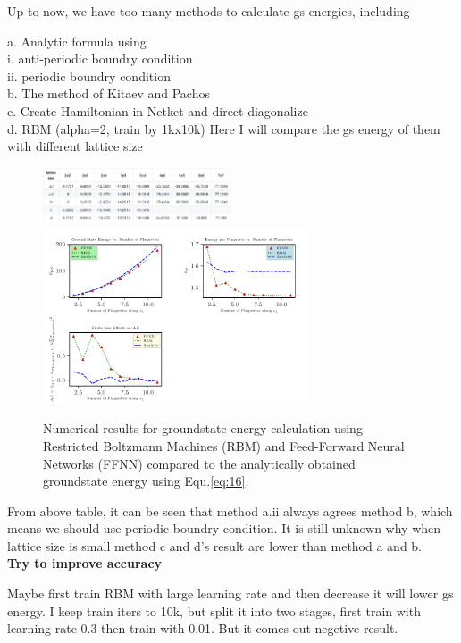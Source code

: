 \documentclass{article}
\begin{document}
Up to now, we have too many methods to calculate gs energies, including

    a. Analytic formula using \\
        i. anti-periodic boundry condition \\
        ii. periodic boundry condition \\
    b. The method of Kitaev and Pachos \\
    c. Create Hamiltonian in Netket and direct diagonalize \\
    d. RBM (alpha=2, train by 1kx10k) Here I will compare the gs energy of them with different lattice size \\


\begin{figure}[!htb]
	\centering
	\includegraphics[width=0.5\textwidth]{./images/gs_tbl.png}
	\includegraphics[width=0.7\textwidth]{./images/plots.pdf}
	\caption{\label{tab:r_space} Numerical results for groundstate energy calculation using Restricted Boltzmann Machines (RBM) 
	and Feed-Forward Neural Networks (FFNN) compared to the analytically obtained groundstate energy using Equ.\hspace{0.2mm}\ref{eq:16}.} 
\end{figure}

From above table, it can be seen that method a.ii always agrees method b, which means we should use periodic boundry condition. It is still unknown why when lattice size is small method c and d's result are lower than method a and b. \\

\textbf{Try to improve accuracy}

Maybe first train RBM with large learning rate and then decrease it will lower gs energy. I keep train iters to 10k, but split it into two stages, first train with learning rate 0.3 then train with 0.01. But it comes out negetive result. 
\end{document}
